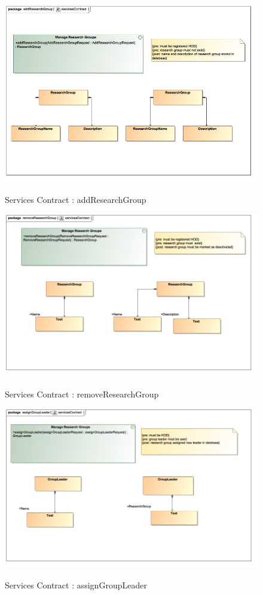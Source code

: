 \documentclass{article}
\begin{document}
		\begin{figure}[H]
			\includegraphics[width=\textwidth]{Vuyani_Diagrams/servicesContractAddResearchGroup.jpg}  \\
			\caption{Services Contract : addResearchGroup}
		\end{figure}
		\begin{figure}[H]
			\includegraphics[width=\textwidth]{Vuyani_Diagrams/servicesContractRemoveResearchGroup.jpg}  \\
			\caption{Services Contract : removeResearchGroup}
		\end{figure}
		\begin{figure}[H]
			\includegraphics[width=\textwidth]{Vuyani_Diagrams/servicesContractAssignGroupLeader.jpg}  \\
			\caption{Services Contract : assignGroupLeader}
		\end{figure}
\end{document}
